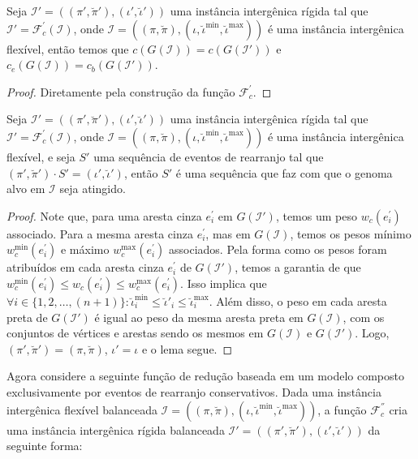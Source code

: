 

\begin{lemma}\label{lemma:AOKHMVAY}
Seja $\mathcal{I'} = ((\pi',\breve\pi'),(\iota',\breve\iota'))$ uma instância intergênica rígida tal que $\mathcal{I'} = \mathcal{F}_{c}^{'}(\mathcal{I})$, onde $\mathcal{I} = ((\pi,\breve\pi),(\iota,\breve\iota^{\min},\breve\iota^{\max}))$ é uma instância intergênica flexível, então temos que $c(G(\mathcal{I})) = c(G(\mathcal{I}'))$ e $c_e(G(\mathcal{I})) = c_b(G(\mathcal{I}'))$.
\end{lemma}
\begin{proof}
Diretamente pela construção da função $\mathcal{F}_{c}^{'}$.
\end{proof}

\begin{lemma}\label{lemma:TQUNQUGX}
Seja $\mathcal{I'} = ((\pi',\breve\pi'),(\iota',\breve\iota'))$ uma instância intergênica rígida tal que $\mathcal{I'} = \mathcal{F}_{c}^{'}(\mathcal{I})$, onde $\mathcal{I} = ((\pi,\breve\pi),(\iota,\breve\iota^{\min},\breve\iota^{\max}))$ é uma instância intergênica flexível, e seja $S'$ uma sequência de eventos de rearranjo tal que $(\pi',\breve\pi') \cdot S' = (\iota',\breve\iota')$, então $S'$ é uma sequência que faz com que o genoma alvo em $\mathcal{I}$ seja atingido.
\end{lemma}
\begin{proof}
Note que, para uma aresta cinza $e^{\prime}_i$ em $G(\mathcal{I}')$, temos um peso $w_c(e^{\prime}_i)$ associado. Para a mesma aresta cinza $e^{\prime}_i$, mas em $G(\mathcal{I})$, temos os pesos mínimo $w^{\min}_c(e^{\prime}_i)$ e máximo $w^{\max}_c(e^{\prime}_i)$ associados. Pela forma como os pesos foram atribuídos em cada aresta cinza $e^{\prime}_i$ de $G(\mathcal{I}')$, temos a garantia de que $w^{\min}_c(e^{\prime}_i) \le w_c(e^{\prime}_i) \le w^{\max}_c(e^{\prime}_i)$. Isso implica que $\forall i \in \{1,2,\dots,({n+1})\}: \breve\iota^{\min}_i \le \breve\iota'_i \le \breve\iota^{\max}_i$. Além disso, o peso em cada aresta preta de $G(\mathcal{I}')$ é igual ao peso da mesma aresta preta em $G(\mathcal{I})$, com os conjuntos de vértices e arestas sendo os mesmos em $G(\mathcal{I})$ e $G(\mathcal{I}')$. Logo, $(\pi',\breve\pi') = (\pi,\breve\pi)$, $\iota' = \iota$ e o lema segue.
\end{proof}

Agora considere a seguinte função de redução baseada em um modelo composto exclusivamente por eventos de rearranjo conservativos. Dada uma instância intergênica flexível balanceada $\mathcal{I} = ((\pi,\breve\pi),(\iota,\breve\iota^{\min},\breve\iota^{\max}))$, a função $\mathcal{F}_{c}^{''}$ cria uma instância intergênica rígida balanceada $\mathcal{I'} = ((\pi',\breve\pi'),(\iota',\breve\iota'))$ da seguinte forma:

